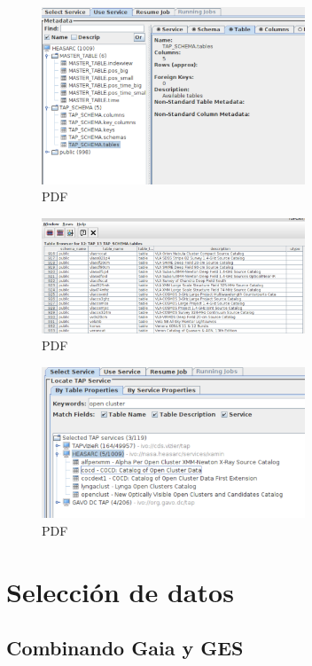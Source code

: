 \begin{figure}
	\centering
	\includegraphics[width=0.7\textwidth]{img/tesis/tap_schema.pdf}
	\caption{PDF}
	\label{fig:tap_schema}
\end{figure}

\begin{figure}
	\centering
	\includegraphics[width=0.7\textwidth]{img/tesis/tap_schema_detail.pdf}
	\caption{PDF}
	\label{fig:tap_schema_detail}
\end{figure}

\begin{figure}
	\centering
	\includegraphics[width=0.7\textwidth]{img/tesis/tap_service.pdf}
	\caption{PDF}
	\label{fig:tap_service}
\end{figure}

\section{Selección de datos}
\subsection{Combinando Gaia y GES}

